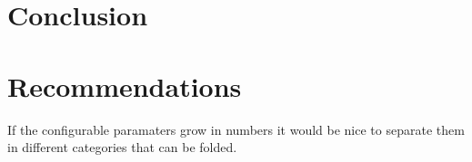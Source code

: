 \section{Conclusion}
\section{Recommendations}
If the configurable paramaters grow in numbers it would be nice to separate them in different categories that can be folded.
